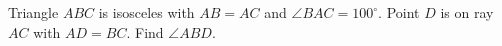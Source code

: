 Triangle $ABC$ is isosceles with $AB=AC$ and $\angle BAC=100^\circ$. Point $D$ is on ray $AC$ with $AD=BC$. Find $\angle ABD$.
